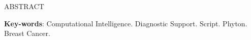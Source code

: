 ABSTRACT

\vspace{\onelineskip}

\noindent
\textbf{Key-words}: Computational Intelligence. Diagnostic Support. Script. Phyton. Breast Cancer.
